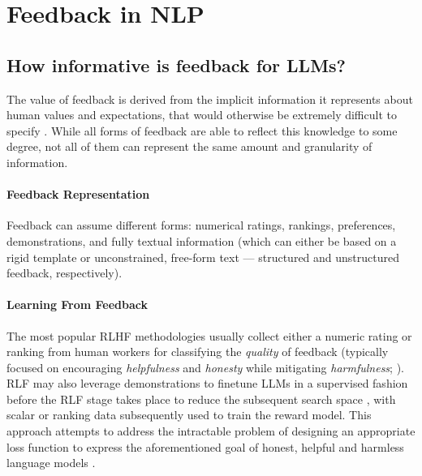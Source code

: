 \section{Feedback in NLP}
\label{sec:background_nlp}


\subsection{How informative is feedback for LLMs?}

The value of feedback is derived from the implicit information it represents about human values and expectations, that would otherwise be extremely difficult to specify \citep{christiano2017deeprl}. While all forms of feedback are able to reflect this knowledge to some degree, not all of them can represent the same amount and granularity of information.

\paragraph{Feedback Representation} Feedback can assume different forms: numerical ratings, rankings, preferences, demonstrations, and fully textual information (which can either be based on a rigid template or unconstrained, free-form text --- structured and unstructured feedback, respectively). 

\paragraph{Learning From Feedback} The most popular RLHF methodologies usually collect either a numeric rating or ranking from human workers for classifying the \textit{quality} of feedback (typically focused on encouraging \textit{helpfulness} and \textit{honesty} while mitigating \textit{harmfulness}; \citealp{askell2021general}). 
RLF may also leverage demonstrations to finetune LLMs in a supervised fashion before the RLF stage takes place to reduce the subsequent search space \citep{ouyang_training_2022, bai_constitutional_2022}, with scalar or ranking data subsequently used to train the reward model. This approach attempts to address the intractable problem of designing an appropriate loss function to express the aforementioned goal of honest, helpful and harmless language models \citep{askell2021general}.

